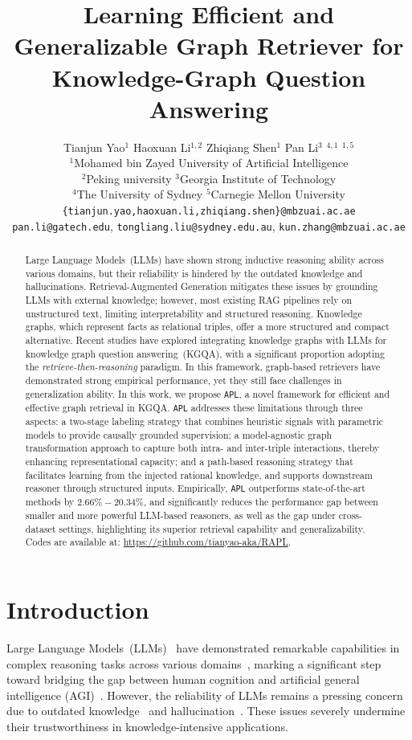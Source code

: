 \documentclass{article}
\title{Learning Efficient and Generalizable Graph Retriever for Knowledge-Graph Question Answering}
\author{%
  Tianjun Yao$^{1}$ \quad
  Haoxuan Li$^{1,2}$ \quad
  Zhiqiang Shen$^{1}$ \quad
  Pan Li$^{3}$ \quad
  \tb{Tongliang Liu}$^{4,1}$ \quad
  \tb{Kun Zhang}$^{1,5}$ \\[0.3em]
  $^{1}$Mohamed bin Zayed University of Artificial Intelligence \\
  $^{2}$Peking university \quad
  $^{3}$Georgia Institute of Technology \\
  $^{4}$The University of Sydney \quad
  $^{5}$Carnegie Mellon University \\
  \texttt{\{tianjun.yao,haoxuan.li,zhiqiang.shen\}@mbzuai.ac.ae}\\
  \texttt{pan.li@gatech.edu}, 
  \texttt{tongliang.liu@sydney.edu.au}, \texttt{kun.zhang@mbzuai.ac.ae} \\
}
\theoremstyle{plain}
\theoremstyle{definition}
\theoremstyle{remark}
\newcommand{\ti}[1]{\textit{#1}}
\newcommand{\proj}{\texttt{\scalebox{1.03}{R}APL}}
\begin{document}
\maketitle


\begin{abstract}
  Large Language Models~(LLMs) have shown strong inductive reasoning ability across various domains, but their reliability is hindered by the outdated knowledge and hallucinations. Retrieval-Augmented Generation mitigates these issues by grounding LLMs with external knowledge; however, most existing RAG pipelines rely on unstructured text, limiting interpretability and structured reasoning. Knowledge graphs, which represent facts as relational triples, offer a more structured and compact alternative. Recent studies have explored integrating knowledge graphs with LLMs for knowledge graph question answering~(KGQA), with a significant proportion adopting the \ti{retrieve-then-reasoning} paradigm. In this framework, graph-based retrievers have demonstrated strong empirical performance, yet they still face challenges in generalization ability. In this work, we propose \proj, a novel framework for efficient and effective graph retrieval in KGQA. \proj{} addresses these limitations through three aspects:  a two-stage labeling strategy that combines heuristic signals with parametric models to provide causally grounded supervision;  a model-agnostic graph transformation approach to capture both intra- and inter-triple interactions, thereby enhancing representational capacity; and  a path-based reasoning strategy that facilitates learning from the injected rational knowledge, and supports downstream reasoner through structured inputs. Empirically, \proj{} outperforms state-of-the-art methods by $2.66\%-20.34\%$, and significantly reduces the performance gap between smaller and more powerful LLM-based reasoners, as well as the gap under cross-dataset settings, highlighting its superior retrieval capability and generalizability. Codes are available at: \url{https://github.com/tianyao-aka/RAPL}.
\end{abstract}

\section{Introduction}
\label{sec:intro}
Large Language Models~(LLMs)~\cite{brown2020language,achiam2023gpt,touvron2023llama} have demonstrated remarkable capabilities in complex reasoning tasks across various domains~\cite{wu2024survey,fan2024hardmath,manning2024automated}, marking a significant step toward bridging the gap between human cognition and artificial general intelligence (AGI)~\cite{huang2023towards,wei2022chain,yao2024tree,bubeck2023sparks}. However, the reliability of LLMs remains a pressing concern due to outdated knowledge~\cite{kasai2023realtime} and hallucination~\cite{10.1145/3571730,huang2023a}. These issues severely undermine their trustworthiness in knowledge-intensive applications. 
\end{document}
